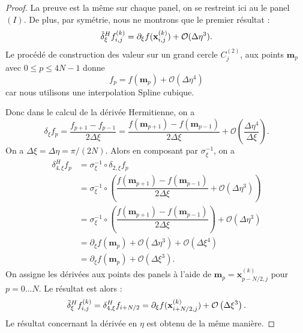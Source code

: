 \begin{proof}
La preuve est la même sur chaque panel, on se restreint ici au le panel $(I)$. De plus, par symétrie, nous ne montrons que le premier résultat :
\begin{equation}
\tilde{\delta}^H_{\xi} f_{i,j}^{(k)} = \partial_{\xi} f(\mathbf{x}_{i,j}^{(k)}) + \mathcal{O}(\Delta \eta^3).
\end{equation}
Le procédé de construction des valeur sur un grand cercle $C_j^{(2)}$, aux points $\mathbf{m}_p$ avec $0 \leq p \leq 4N-1$ donne
\begin{equation}
f_p = f(\mathbf{m}_p) + \mathcal{O}(\Delta \eta^4)
\end{equation}
car nous utilisons une interpolation Spline cubique.

Donc dans le calcul de la dérivée Hermitienne, on a 
\begin{equation}
\delta_{\xi} f_p = \dfrac{f_{p+1} - f_{p-1}}{2 \Delta \xi} = \dfrac{f(\mathbf{m}_{p+1}) - f(\mathbf{m}_{p-1})}{2 \Delta \xi} + \mathcal{O}\left( \dfrac{\Delta \eta^4}{\Delta \xi} \right).
\end{equation}
On a $\Delta \xi = \Delta \eta = \pi/(2N)$. Alors en composant par $\sigma_{\xi}^{-1}$, on a 
\begin{align*}
\delta_{4,\xi}^H f_p & = \sigma_{\xi}^{-1} \circ \delta_{2,\xi} f_p \\
                   & = \sigma_{\xi}^{-1} \circ \left( \dfrac{f(\mathbf{m}_{p+1}) - f(\mathbf{m}_{p-1})}{2 \Delta \xi} + \mathcal{O}\left( \Delta \eta^3 \right) \right)\\
                   & = \sigma_{\xi}^{-1} \circ \left( \dfrac{f(\mathbf{m}_{p+1}) - f(\mathbf{m}_{p-1})}{2 \Delta \xi}\right)  + \mathcal{O}\left( \Delta \eta^3 \right) \\
                   & = \partial_{\xi}f(\mathbf{m}_p) + \mathcal{O}\left( \Delta \eta^3 \right) + \mathcal{O}\left( \Delta \xi^4 \right) \\
                   & = \partial_{\xi}f(\mathbf{m}_p) + \mathcal{O}\left( \Delta \xi^3 \right).
\end{align*}
On assigne les dérivées aux points des panels à l'aide de $\mathbf{m}_p=\mathbf{x}^{(k)}_{p-N/2,j}$ pour $p = 0 \ldots N$. Le résultat est alors :
\begin{equation}
\tilde{\delta}^H_{\xi} f^{(k)}_{i,j} = \delta_{4,\xi}^H f_{i+N/2} = \partial_{\xi} f(\mathbf{x}^{(k)}_{i+N/2,j}) + \mathcal{O}\left( \Delta \xi^3 \right).
\end{equation}
Le résultat concernant la dérivée en $\eta$ est obtenu de la même manière.
\end{proof}


